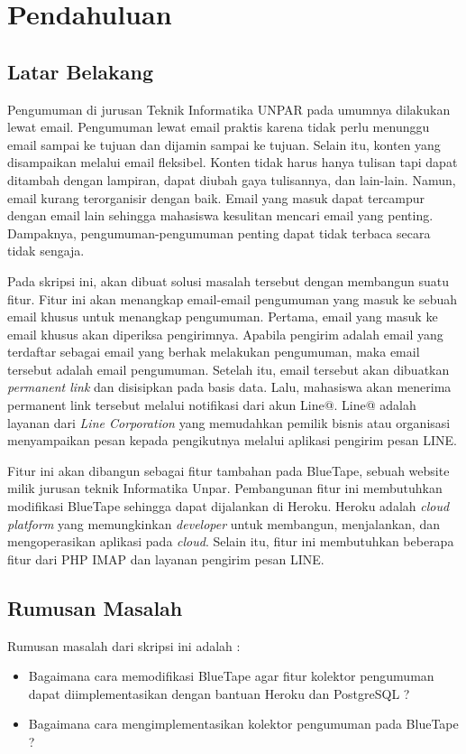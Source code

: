 \chapter{Pendahuluan}
\label{chap:pendahuluan}
   
\section{Latar Belakang}
\label{sec:latarBelakang}
Pengumuman di jurusan Teknik Informatika UNPAR pada umumnya dilakukan lewat email. Pengumuman lewat email praktis karena tidak perlu menunggu email sampai ke tujuan dan dijamin sampai ke tujuan. Selain itu, konten yang disampaikan melalui email fleksibel. Konten tidak harus hanya tulisan tapi dapat ditambah dengan lampiran, dapat diubah gaya tulisannya, dan lain-lain. Namun, email kurang terorganisir dengan baik. Email yang masuk dapat tercampur dengan email lain sehingga mahasiswa kesulitan mencari email yang penting. Dampaknya, pengumuman-pengumuman penting dapat tidak terbaca secara tidak sengaja.

Pada skripsi ini, akan dibuat solusi masalah tersebut dengan membangun suatu fitur. Fitur ini akan menangkap email-email pengumuman yang masuk ke sebuah email khusus untuk menangkap pengumuman. Pertama, email yang masuk ke email khusus akan diperiksa pengirimnya. Apabila pengirim adalah email yang terdaftar sebagai email yang berhak melakukan pengumuman, maka email tersebut adalah email pengumuman. Setelah itu, email tersebut akan dibuatkan \textit{permanent link} dan disisipkan pada basis data. Lalu, mahasiswa akan menerima permanent link tersebut melalui notifikasi dari akun Line@. Line@ adalah layanan dari \textit{Line Corporation} yang memudahkan pemilik bisnis atau organisasi menyampaikan pesan kepada pengikutnya melalui aplikasi pengirim pesan LINE.

Fitur ini akan dibangun sebagai fitur tambahan pada BlueTape, sebuah website milik jurusan teknik Informatika Unpar. Pembangunan fitur ini membutuhkan modifikasi BlueTape sehingga dapat dijalankan di Heroku. Heroku adalah \textit{cloud platform} yang memungkinkan \textit{developer} untuk membangun, menjalankan, dan mengoperasikan aplikasi pada \textit{cloud}. Selain itu, fitur ini membutuhkan beberapa fitur dari PHP IMAP dan layanan pengirim pesan LINE.

\section{Rumusan Masalah}
\label{sec:rumusanmasalah}
Rumusan masalah dari skripsi ini adalah : 
\begin{itemize}
\item Bagaimana cara memodifikasi BlueTape agar fitur kolektor pengumuman dapat diimplementasikan dengan bantuan Heroku dan PostgreSQL ?
\item Bagaimana cara mengimplementasikan kolektor pengumuman pada BlueTape ?
\end{itemize}

